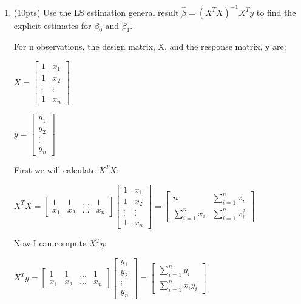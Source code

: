 \documentclass[
]{article}
\begin{document}
\begin{enumerate}
\def\labelenumi{(\alph{enumi})}
\item
  (10pts) Use the LS estimation general result
  \(\hat\beta = (X^TX)^{-1}X^Ty\) to find the explicit estimates for
  \(\beta_0\) and \(\beta_1\).

  For n observations, the design matrix, X, and the response matrix, y
  are:

  \(X = \begin{bmatrix}
  1 & x_1\\
  1 & x_2\\
  \vdots & \vdots\\
  1 & x_n
  \end{bmatrix}\)

  \(y = \begin{bmatrix}
  y_1\\
  y_2\\
  \vdots\\
  y_n
  \end{bmatrix}\)

  First we will calculate \(X^TX\):

  \(X^TX = \begin{bmatrix}
  1 & 1 & \dots & 1\\
  x_1 & x_2 & \dots & x_n
  \end{bmatrix}\begin{bmatrix}
  1 & x_1\\
  1 & x_2\\
  \vdots & \vdots\\
  1 & x_n
  \end{bmatrix}=
  \begin{bmatrix}
  n & \sum_{i=1}^nx_i\\
  \sum_{i=1}^nx_i & \sum_{i=1}^nx_i^2
  \end{bmatrix}\)

  Now I can compute \(X^Ty\):

  \(X^Ty = \begin{bmatrix}
  1 & 1 & \dots & 1\\
  x_1 & x_2 & \dots & x_n
  \end{bmatrix}\begin{bmatrix}
  y_1\\
  y_2\\
  \vdots\\
  y_n
  \end{bmatrix} = \begin{bmatrix}
  \sum_{i=1}^ny_i\\
  \sum_{i=1}^nx_iy_i
  \end{bmatrix}\)


\end{enumerate}
\end{document}
